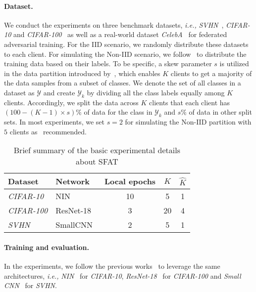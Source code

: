 \documentclass{article} %
\newcommand{\cY}{\mathcal{Y}}
\theoremstyle{plain}
\theoremstyle{definition}
\theoremstyle{remark}
\begin{document}
\paragraph{Dataset.}
We conduct the experiments on three benchmark datasets, \textit{i.e.,} \textit{SVHN}~\citep{netzer2011reading_SVHN}, \textit{CIFAR-10} and \textit{CIFAR-100}~\citep{krizhevsky2009learning_cifar10} as well as a real-world dataset \textit{CelebA}~\citep{caldas2018leaf} for federated adversarial training. For the IID scenario, we randomly distribute these datasets to each client. For simulating the Non-IID scenario, we follow~\citet{mcmahan2017communication,shah2021adversarial} to distribute the training data based on their labels. To be specific, a skew parameter $s$ is utilized in the data partition introduced by~\citet{shah2021adversarial}, which enables $K$ clients to get a majority of the data samples from a subset of classes. We denote the set of all classes in a dataset as $\cY$ and create $\cY_{k}$ by dividing all the class labels equally among $K$ clients. Accordingly, we split the data across $K$ clients that each client has $(100-(K-1)\times s)\%$ of data for the class in $\cY_k$ and $s\%$ of data in other split sets. In most experiments, we set $s=2$ for simulating the Non-IID partition with $5$ clients as~\citet{shah2021adversarial} recommended.  
\vspace{3mm}
\begin{table}[ht]
    \centering
    \caption{Brief summary of the basic experimental details about SFAT}
    \begin{tabular}{l|l|c|c|c}
    \toprule[1.5pt]
    Dataset & Network & Local epochs & $K$ & $\widehat{K}$ \\
    \midrule[0.6pt]
    \midrule[0.6pt]
     \textit{CIFAR-10} & NIN~\citep{shah2021adversarial} & 10 & 5 & 1 \\
     \midrule[0.6pt]
     \textit{CIFAR-100} & ResNet-18~\citep{chen2021robust} & 3 & 20 & 4 \\
    \midrule[0.6pt]
     \textit{SVHN} & SmallCNN~\citep{Zhang_trades} & 2 & 5 & 1 \\
    \midrule[0.6pt]
    \bottomrule[1.5pt]
    \end{tabular}
    \label{tab:exp_set}
\end{table}
\paragraph{Training and evaluation.} In the experiments, we follow the previous works~\citep{Zhang_trades,shah2021adversarial} to leverage the same architectures, \textit{i.e.,} \textit{NIN}~\citep{lin2014network} for \textit{CIFAR-10}, \textit{ResNet-18}~\citep{he2016deep} for \textit{CIFAR-100} and \textit{Small CNN}~\citep{Zhang_trades} for \textit{SVHN}. 
\end{document}
